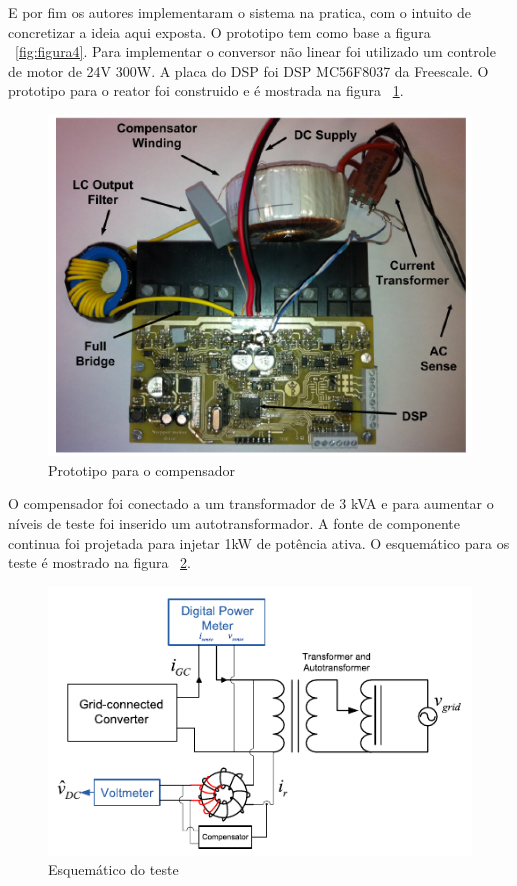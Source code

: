 \documentclass[paper=a4, fontsize=11pt]{article}
\begin{document}
E por fim os autores implementaram o sistema na pratica, com o intuito de concretizar
a ideia aqui exposta. O prototipo tem como base a figura ~\ref{fig:figura4}. Para
implementar o conversor não linear foi utilizado um controle de motor de 24V 300W.
A placa do DSP foi DSP MC56F8037 da Freescale. O prototipo para o reator foi
construido e é mostrada na figura ~\ref{fig:figura11}. 

\begin{figure}[!ht]
	\centering
	\includegraphics[scale=.8]{fig11.png}
    \caption{Prototipo para o compensador}
    \label{fig:figura11}
\end{figure}

O compensador foi conectado a um transformador de 3 kVA e para aumentar o níveis 
de teste foi inserido um autotransformador. A fonte de componente continua foi
projetada para injetar 1kW de potência ativa. O esquemático para os teste
é mostrado na figura ~\ref{fig:figura12}.

\begin{figure}[!ht]
	\centering
	\includegraphics[scale=.8]{fig12.png}
    \caption{Esquemático do teste}
    \label{fig:figura12}
\end{figure}
\end{document}

